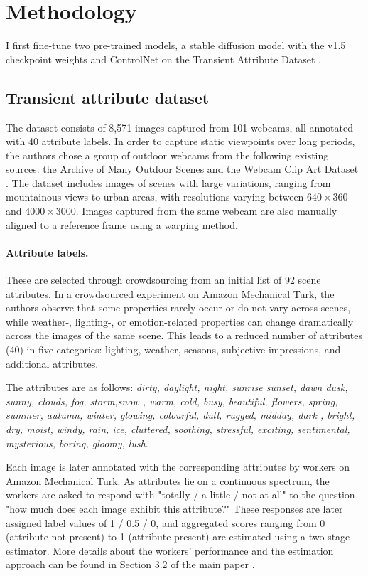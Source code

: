 \section{Methodology}
I first fine-tune two pre-trained models,  a stable diffusion model with the v1.5 checkpoint weights \cite{rombach2022high} and ControlNet \cite{zhang2023adding} on the Transient Attribute Dataset \cite{laffont2014transient}. 

\subsection{Transient attribute dataset} 

The dataset consists of 8,571 images captured from 101 webcams, all annotated with 40 attribute labels. In order to capture static viewpoints over long periods, the authors chose a group of outdoor webcams from the following existing sources: the Archive of Many Outdoor Scenes \cite{jacobs2007consistent} and the Webcam Clip Art Dataset \cite{lalonde2009webcam}. The dataset includes images of scenes with large variations, ranging from mountainous views to urban areas, with resolutions varying between $640 \times 360$ and $4000 \times 3000$. Images captured from the same webcam are also manually aligned to a reference frame using a warping method.

\paragraph{Attribute labels.} These are selected through crowdsourcing from an initial list of 92 scene attributes. In a crowdsourced experiment on Amazon Mechanical Turk, the authors observe that some properties rarely occur or do not vary across scenes, while weather-, lighting-, or emotion-related properties can change dramatically across the images of the same scene. This leads to a reduced number of attributes (40) in five categories: lighting, weather, seasons, subjective impressions, and additional attributes.

The attributes are as follows: \textit{dirty, daylight, night, sunrise sunset, dawn dusk, sunny, clouds, fog, storm,snow
, warm, cold, busy, beautiful, flowers, spring, summer, autumn, winter, glowing, colourful, dull, rugged, midday, dark
, bright, dry, moist, windy, rain, ice, cluttered, soothing, stressful, exciting, sentimental, mysterious, boring, gloomy, lush}.

Each image is later annotated with the corresponding attributes by workers on Amazon Mechanical Turk. As attributes lie on a continuous spectrum, the workers are asked to respond with "totally / a little / not at all" to the question "how much does each image exhibit this attribute?" These responses are later assigned label values of 1 / 0.5 / 0, and aggregated scores ranging from 0 (attribute not present) to 1 (attribute present) are estimated using a two-stage estimator. More details about the workers' performance and the estimation approach can be found in Section 3.2 of the main paper \cite{laffont2014transient}.


